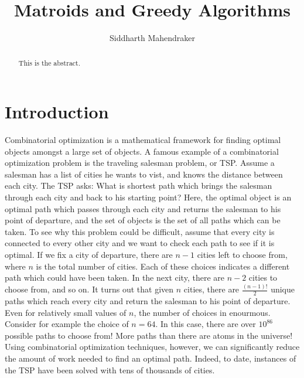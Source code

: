 \documentclass[a4paper,11pt]{report}
\begin{document}
\title{Matroids and Greedy Algorithms}
\author{Siddharth Mahendraker}

\maketitle

\begin{abstract}
This is the abstract.
\end{abstract}

\setcounter{secnumdepth}{3}
\renewcommand{\thesection}{\arabic{section}.0}
\renewcommand{\cftsecfont}{\bfseries}
\setlength\cftbeforesecskip{3pt}
\setlength\cftbeforesubsecskip{3pt}

\setcounter{page}{1}
\tableofcontents
\clearpage
\setcounter{page}{1}

\section{Introduction}

Combinatorial optimization is a mathematical framework for finding optimal
objects amongst a large set of objects. A famous example of a combinatorial
optimization problem is the traveling salesman problem, or TSP. Assume a
salesman has a list of cities he wants to vist, and knows the distance
between each city. The TSP asks: What is shortest path which brings the
salesman through each city and back to his starting point? Here, the optimal
object is an optimal path which passes through each city and returns the
salesman to his point of departure, and the set of objects is the set of
all paths which can be taken. To see why this problem could be difficult,
assume that every city is connected to every other city and we want to check 
each path to see if it is optimal. If we fix a city of
departure, there are $n-1$ cities left to choose from, where $n$ is the total
number of cities. Each of these choices indicates a different path which
could have been taken. In the next city, there are $n-2$ cities to choose
from, and so on. It turns out that given $n$ cities, there are
$\frac{(n-1)!}{2}$ unique paths which reach every city and return the
salesman to his point of departure. Even for relatively small values of $n$,
the number of choices in enourmous. Consider for example the choice of
$n = 64$. In this case, there are over $10^{86}$ possible paths to choose
from! More paths than there are atoms in the universe! Using combinatorial
optimization techniques, however, we can significantly reduce the amount of
work needed to find an optimal path. Indeed, to date, instances of the TSP
have been solved with tens of thousands of cities.
\end{document}
